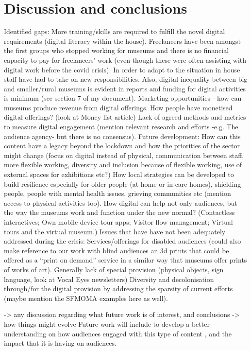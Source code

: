 \documentclass{egpubl}
\begin{document}
\section{Discussion and conclusions}
\label{disc}
Identified gaps:
More training/skills are required to fulfill the novel digital requirements (digital literacy within the house). Freelancers have been amongst the first groups who stopped working for museums and there is no financial capacity to pay for freelancers' work (even though these were often assisting with digital work before the covid crisis). In order to adapt to the situation in house staff have had to take on new responsibilities. Also, digital inequality between big and smaller/rural museums is evident in reports and funding for digital activities is minimum (see section 7 of my document).
Marketing opportunities  - how can museums produce revenue from digital offerings. How people have monetised digital offerings? (look at Money list article)
Lack of agreed methods and metrics to measure digital engagement (mention relevant research and efforts -e.g. The audience agency- but there is no consensus).
Future development:
How can this content have a legacy beyond the lockdown and how the priorities of the sector might change (focus on digital instead of physical, communication between staff, more flexible working, diversity and inclusion because of flexible working, use of external spaces for exhibitions etc?)
How local strategies can be developed to build resilience especially for older people (at home or in care homes), shielding people, people with mental health issues, grieving communities etc (mention access to physical activities too). 
How digital can help not only audiences, but the way the museums work and function under the new normal? (Contactless interactives; Own mobile device tour apps; Visitor flow management; Virtual tours and the virtual museum.)
Issues that have have not been adequately addressed during the crisis:
Services/offerings for disabled audiences (could also make reference to our work with blind audiences an 3d prints that could be offered as a “print on demand” service in a similar way that museums offer prints of works of art). Generally lack of special provision (physical objects, sign language, look at Vocal Eyes newsletters)
Diversity and decolonisation through/for the digital provision by addressing the sparsity of current efforts (maybe mention the SFMOMA examples here as well).

-> any discussion regarding what future work is of interest, and conclusions
->  how things might evolve
Future work will include to develop a better  understanding on how audiences engaged with this type of content  , and the impact that it is having on audiences. 
\end{document}

